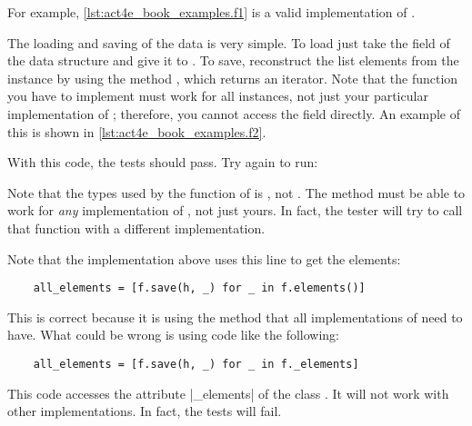 For example, \cref{lst:act4e_book_examples.f1} is a valid implementation of \FiniteSet.

\begin{longcode}
    \caption{}
    \label{lst:act4e_book_examples.f1}
\end{longcode}

The loading and saving of the data is very simple.
To load just take the  field of the data structure and give it to .
To save, reconstruct the list elements from the  instance by using the method , which returns an iterator.
Note that the  function you have to implement must work for all \FiniteSet instances, not just your particular implementation of \FiniteSet; therefore, you cannot access the  field directly.
An example of this is shown in \cref{lst:act4e_book_examples.f2}.

\begin{longcode}
    \caption{}
    \label{lst:act4e_book_examples.f2}
\end{longcode}

With this code, the tests should pass.
Try again to run:


Note that the types used by the function  of  is \FiniteSet,
not .
The method must be able to work for \emph{any} implementation of  \FiniteSet,
not just yours.
In fact, the tester will try to call that function with a different implementation.

Note that the implementation above uses this line to get the elements:


\begin{verbatim}
    all_elements = [f.save(h, _) for _ in f.elements()]
\end{verbatim}

This is correct because it is using the method  that all implementations of \FiniteSet need to have.
What could be wrong is using code like the following:


\begin{verbatim}
    all_elements = [f.save(h, _) for _ in f._elements]
\end{verbatim}

This code accesses the attribute \pystr|_elements| of the class .
It will not work with other implementations.
In fact, the tests will fail.
